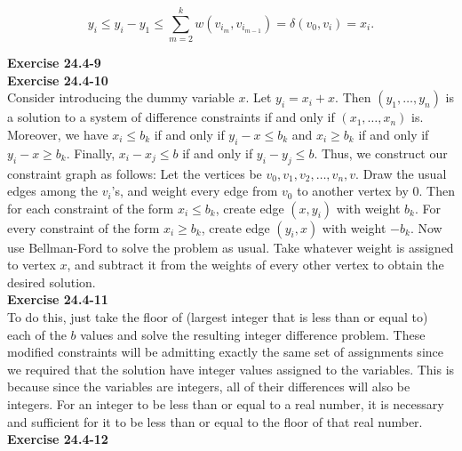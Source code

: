 \documentclass{article}
\begin{document}
\[ y_i \leq y_i - y_1 \leq \sum_{m=2}^k w(v_{i_m}, v_{i_{m-1}}) = \delta(v_0, v_i) = x_i.\]

\noindent\textbf{Exercise 24.4-9}\\

\noindent\textbf{Exercise 24.4-10}\\

Consider introducing the dummy variable $x$.  Let $y_i = x_i + x$.  Then $(y_1, \ldots, y_n)$ is a solution to a system of difference constraints if and only if $(x_1, \ldots, x_n)$ is.  Moreover, we have $x_i \leq b_k$ if and only if $y_i - x \leq b_k$ and $x_i \geq b_k$ if and only if $y_i - x \geq b_k$.  Finally, $x_i - x_j \leq b$ if and only if $y_i - y_j \leq b$.  Thus, we construct our constraint graph as follows:  Let the vertices be $v_0, v_1, v_2, \ldots, v_n, v$.  Draw the usual edges among the $v_i$'s, and weight every edge from $v_0$ to another vertex by 0.  Then for each constraint of the form $x_i \leq b_k$, create edge $(x,y_i)$ with weight $b_k$.  For every constraint of the form $x_i \geq b_k$, create edge $(y_i, x)$ with weight $-b_k$.  Now use Bellman-Ford to solve the problem as usual.  Take whatever weight is assigned to vertex $x$, and subtract it from the weights of every other vertex to obtain the desired solution. \\

\noindent\textbf{Exercise 24.4-11}\\

To do this, just take the floor of (largest integer that is less than or equal to) each of the $b$ values and solve the resulting integer difference problem. These modified constraints will be admitting exactly the same set of assignments since we required that the solution have integer values assigned to the variables. This is because since the variables are integers, all of their differences will also be integers. For an integer to be less than or equal to a real number, it is necessary and sufficient for it to be less than or equal to the floor of that real number.\\

\noindent\textbf{Exercise 24.4-12}\\


\end{document}
